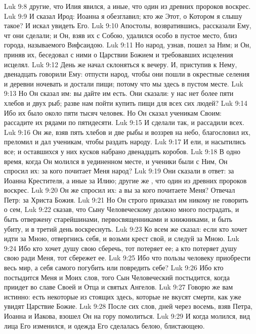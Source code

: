 \vs Luk 9:8 другие, что Илия явился, а иные, что один из древних пророков воскрес.
\vs Luk 9:9 И сказал Ирод: Иоанна я обезглавил; кто же Этот, о Котором я слышу такое? И искал увидеть Его.
\rsbpar\vs Luk 9:10 Апостолы, возвратившись, рассказали Ему, чт они сделали; и Он, взяв их с Собою, удалился особо в пустое место, близ города, называемого Вифсаидою.
\rsbpar\vs Luk 9:11 Но народ, узнав, пошел за Ним; и Он, приняв их, беседовал с ними о Царствии Божием и требовавших исцеления исцелял.
\vs Luk 9:12 День же начал склоняться к вечеру. И, приступив к Нему, двенадцать говорили Ему: отпусти народ, чтобы они пошли в окрестные селения и деревни ночевать и достали пищи; потому что мы здесь в пустом месте.
\vs Luk 9:13 Но Он сказал им: вы дайте им есть. Они сказали: у нас нет более пяти хлебов и двух рыб; разве нам пойти купить пищи для всех сих людей?
\vs Luk 9:14 Ибо их было около пяти тысяч человек. Но Он сказал ученикам Своим: рассадите их рядами по пятидесяти.
\vs Luk 9:15 И сделали так, и рассадили всех.
\vs Luk 9:16 Он же, взяв пять хлебов и две рыбы и воззрев на небо, благословил их, преломил и дал ученикам, чтобы раздать народу.
\vs Luk 9:17 И ели, и насытились все; и оставшихся у них кусков набрано двенадцать коробов.
\rsbpar\vs Luk 9:18 В одно время, когда Он молился в уединенном месте, и ученики были с Ним, Он спросил их: за кого почитает Меня народ?
\vs Luk 9:19 Они сказали в ответ: за Иоанна Крестителя, а иные за Илию; другие же , что один из древних пророков воскрес.
\vs Luk 9:20 Он же спросил их: а вы за кого почитаете Меня? Отвечал Петр: за Христа Божия.
\vs Luk 9:21 Но Он строго приказал им никому не говорить о сем,
\vs Luk 9:22 сказав, что Сыну Человеческому должно много пострадать, и быть отвержену старейшинами, первосвященниками и книжниками, и быть убиту, и в третий день воскреснуть.
\rsbpar\vs Luk 9:23 Ко всем же сказал: если кто хочет идти за Мною, отвергнись себя, и возьми крест свой, и следуй за Мною.
\vs Luk 9:24 Ибо кто хочет душу свою сберечь, тот потеряет ее; а кто потеряет душу свою ради Меня, тот сбережет ее.
\vs Luk 9:25 Ибо что пользы человеку приобрести весь мир, а себя самого погубить или повредить себе?
\vs Luk 9:26 Ибо кто постыдится Меня и Моих слов, того Сын Человеческий постыдится, когда приидет во славе Своей и Отца и святых Ангелов.
\vs Luk 9:27 Говорю же вам истинно: есть некоторые из стоящих здесь, которые не вкусят смерти, как уже увидят Царствие Божие.
\rsbpar\vs Luk 9:28 После сих слов, дней через восемь, взяв Петра, Иоанна и Иакова, взошел Он на гору помолиться.
\vs Luk 9:29 И когда молился, вид лица Его изменился, и одежда Его сделалась белою, блистающею.
